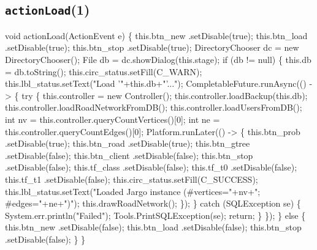 \subsection{\texttt{actionLoad}(1)}
\nwenddocs{}\endmoddef{}
void actionLoad(ActionEvent e) \{
  this.btn_new      .setDisable(true);
  this.btn_load     .setDisable(true);
  this.btn_stop     .setDisable(true);
  DirectoryChooser dc = new DirectoryChooser();
  File db = dc.showDialog(this.stage);
  if (db != null) \{
    this.db = db.toString();
    this.circ_status.setFill(C_WARN);
    this.lbl_status.setText("Load '"+this.db+"'...");
    CompletableFuture.runAsync(() -> \{
      try \{
        this.controller = new Controller();
        this.controller.loadBackup(this.db);
        this.controller.loadRoadNetworkFromDB();
        this.controller.loadUsersFromDB();
        int nv = this.controller.queryCountVertices()[0];
        int ne = this.controller.queryCountEdges()[0];
        Platform.runLater(() -> \{
          this.btn_prob     .setDisable(true);
          this.btn_road     .setDisable(true);
          this.btn_gtree    .setDisable(false);
          this.btn_client   .setDisable(false);
          this.btn_stop     .setDisable(false);
          this.tf_class     .setDisable(false);
          this.tf_t0        .setDisable(false);
          this.tf_t1        .setDisable(false);
          this.circ_status.setFill(C_SUCCESS);
          this.lbl_status.setText("Loaded Jargo instance (#vertices="+nv+"; #edges="+ne+")");
          this.drawRoadNetwork();
        \});
      \} catch (SQLException se) \{
        System.err.println("Failed");
        Tools.PrintSQLException(se);
        return;
      \}
    \});
  \} else \{
    this.btn_new      .setDisable(false);
    this.btn_load     .setDisable(false);
    this.btn_stop     .setDisable(false);
  \}
\}
\eatline
{}\nwendcode{}\nwdocspar
